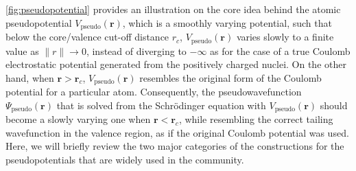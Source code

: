 \cref{fig:pseudopotential} provides an illustration on the core idea behind the atomic pseudopotential $V_{\mathrm{pseudo}}(\bm{r})$, which is a smoothly varying potential, such that below the core/valence cut-off distance $r_c$, $V_{\mathrm{pseudo}}(\bm{r})$ varies slowly to a finite value as $\|r\|\to0$, instead of diverging to $-\infty$ as for the case of a true Coulomb electrostatic potential generated from the positively charged nuclei. On the other hand, when $\bm{r}>\bm{r}_c$, $V_{\mathrm{pseudo}}(\bm{r})$ resembles the original form of the Coulomb potential for a particular atom. Consequently, the pseudowavefunction $\Psi_{\mathrm{pseudo}}(\bm{r})$ that is solved from the Schr\"{o}dinger equation with $V_{\mathrm{pseudo}}(\bm{r})$ should become a slowly varying one when $\bm{r}<\bm{r}_c$, while resembling the correct tailing wavefunction in the valence region, as if the original Coulomb potential was used.  Here, we will briefly review the two major categories of the constructions for the pseudopotentials that are widely used in the community.

